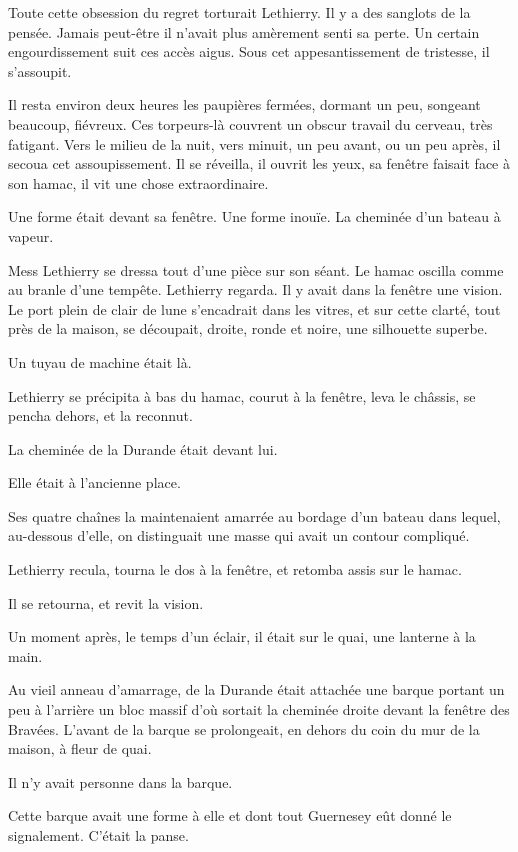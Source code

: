 \documentclass[french,twoside]{book} %
\begin{document}
Toute cette obsession du regret torturait Lethierry.  Il y a des sanglots de la pensée. Jamais peut-être il n’avait plus amèrement senti sa perte. Un certain engourdissement suit ces accès aigus. Sous cet appesantissement de tristesse, il s’assoupit.\par
Il resta environ deux heures les paupières fermées, dormant un peu, songeant beaucoup, fiévreux. Ces torpeurs-là couvrent un obscur travail du cerveau, très fatigant. Vers le milieu de la nuit, vers minuit, un peu avant, ou un peu après, il secoua cet assoupissement. Il se réveilla, il ouvrit les yeux, sa fenêtre faisait face à son hamac, il vit une chose extraordinaire.\par
Une forme était devant sa fenêtre. Une forme inouïe. La cheminée d’un bateau à vapeur.\par
Mess Lethierry se dressa tout d’une pièce sur son séant. Le hamac oscilla comme au branle d’une tempête. Lethierry regarda. Il y avait dans la fenêtre une vision. Le port plein de clair de lune s’encadrait dans les vitres, et sur cette clarté, tout près de la maison, se découpait, droite, ronde et noire, une silhouette superbe.\par
Un tuyau de machine était là.\par
Lethierry se précipita à bas du hamac, courut à la fenêtre, leva le châssis, se pencha dehors, et la reconnut.\par
La cheminée de la Durande était devant lui.\par
Elle était à l’ancienne place.\par
Ses quatre chaînes la maintenaient amarrée au bordage d’un bateau dans lequel, au-dessous d’elle, on distinguait une masse qui avait un contour compliqué.\par
 Lethierry recula, tourna le dos à la fenêtre, et retomba assis sur le hamac.\par
Il se retourna, et revit la vision.\par
Un moment après, le temps d’un éclair, il était sur le quai, une lanterne à la main.\par
Au vieil anneau d’amarrage, de la Durande était attachée une barque portant un peu à l’arrière un bloc massif d’où sortait la cheminée droite devant la fenêtre des Bravées. L’avant de la barque se prolongeait, en dehors du coin du mur de la maison, à fleur de quai.\par
Il n’y avait personne dans la barque.\par
Cette barque avait une forme à elle et dont tout Guernesey eût donné le signalement. C’était la panse.\par
\end{document}
